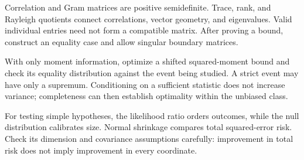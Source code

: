 Correlation and Gram matrices are positive semidefinite. Trace, rank, and Rayleigh quotients connect correlations, vector geometry, and eigenvalues. Valid individual entries need not form a compatible matrix. After proving a bound, construct an equality case and allow singular boundary matrices.

With only moment information, optimize a shifted squared-moment bound and check its equality distribution against the event being studied. A strict event may have only a supremum. Conditioning on a sufficient statistic does not increase variance; completeness can then establish optimality within the unbiased class.

For testing simple hypotheses, the likelihood ratio orders outcomes, while the null distribution calibrates size. Normal shrinkage compares total squared-error risk. Check its dimension and covariance assumptions carefully: improvement in total risk does not imply improvement in every coordinate.
\par\smallskip
